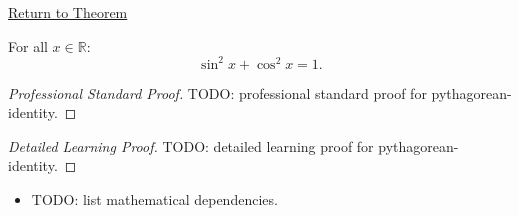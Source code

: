 \newpage
{}
\label{prf:pythagorean-identity}

\begin{remark*}[Return]
\hyperref[prop:pythagorean-identity]{Return to Theorem}
\end{remark*}

\begin{theorem*}
For all $x \in \mathbb{R}$:
\[
  \sin^2 x + \cos^2 x = 1.
\]

\smallskip\noindent
\end{theorem*}

\begin{proof}[Professional Standard Proof]
\LRAProofBodyStart
TODO: professional standard proof for pythagorean-identity.
\end{proof}

\begin{proof}[Detailed Learning Proof]
\LRAProofBodyStart
TODO: detailed learning proof for pythagorean-identity.
\end{proof}

\begin{remark*}
\end{remark*}

\begin{dependencies}
\begin{itemize}
  \item TODO: list mathematical dependencies.
\end{itemize}
\end{dependencies}

\clearpage
